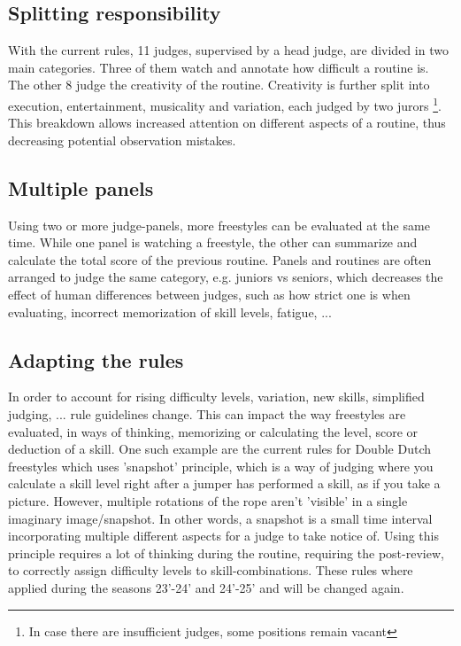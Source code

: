 \subsection{Splitting responsibility}
\label{lit:splitting-responsibility}
With the current rules, 11 judges, supervised by a head judge, are divided in two main categories. Three of them watch and annotate how difficult a routine is. The other 8 judge the creativity of the routine. Creativity is further split into execution, entertainment, musicality and variation, each judged by two jurors \footnote{In case there are insufficient judges, some positions remain vacant}. This breakdown allows increased attention on different aspects of a routine, thus decreasing potential observation mistakes.

\subsection{Multiple panels}
\label{lit:multiple-panels}
Using two or more judge-panels, more freestyles can be evaluated at the same time. While one panel is watching a freestyle, the other can summarize and calculate the total score of the previous routine. Panels and routines are often arranged to judge the same category, e.g. juniors vs seniors, which decreases the effect of human differences between judges, such as how strict one is when evaluating, incorrect memorization of skill levels, fatigue, ...

\subsection{Adapting the rules}
\label{lit:adapting-the-rules}
In order to account for rising difficulty levels, variation, new skills, simplified judging, ... rule guidelines change. This can impact the way freestyles are evaluated, in ways of thinking, memorizing or calculating the level, score or deduction of a skill. One such example are the current rules for Double Dutch freestyles which uses 'snapshot' principle, which is a way of judging where you calculate a skill level right after a jumper has performed a skill, as if you take a picture. However, multiple rotations of the rope aren't 'visible' in a single imaginary image/snapshot. In other words, a snapshot is a small time interval incorporating multiple different aspects for a judge to take notice of. Using this principle requires a lot of thinking during the routine, requiring the post-review, to correctly assign difficulty levels to skill-combinations. These rules where applied during the seasons 23'-24' and 24'-25' and will be changed again.


